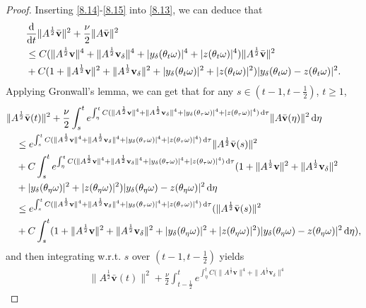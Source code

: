 \documentclass{elsarticle}
\theoremstyle{definition}
\numberwithin{equation}{section}
\renewcommand{\d}{{\rm{d}}}
\begin{document}
\begin{proof}
Inserting \eqref{8.14}-\eqref{8.15} into \eqref{8.13}, we can deduce that
\begin{align}\label{9.5}
&\frac{\d}{\d t}\|A^\frac12\bar{\textbf{v}}\|^2+  \frac{\nu}{2} \|A\bar{\textbf{v}}\|^2\nonumber\\
&\leq C(\|A^\frac12\textbf{v}\|^4+\|A^\frac12\textbf{v}_\delta\|^4+|y_\delta(\theta_t\omega)|^4+|z(\theta_t\omega)|^4)
\|A^\frac12\bar{\textbf{v}}\|^2\nonumber\\
&+ C(1+\|A^\frac12\textbf{v}\|^2+\|A^\frac12\textbf{v}_\delta\|^2+|y_\delta(\theta_t\omega)|^2+|z(\theta_t\omega)|^2)
|y_\delta(\theta_t\omega)-z(\theta_t\omega)|^2.
\end{align}
Applying Gronwall's lemma, we can get that for any $s\in(t-1, t-\frac 12)$, $t\geq 1$,
\begin{align}
 & \|A^\frac12\bar{\textbf{v}}(t)\|^2
 +  \frac{\nu }{2} \int_s^te^{\int_\eta^tC(\|A^\frac12\textbf{v}\|^4+\|A^\frac12\textbf{v}_\delta\|^4
 +|y_\delta(\theta_\tau\omega)|^4+|z(\theta_\tau\omega)|^4)\, \d \tau}\|A\bar{\textbf{v}}(\eta) \|^2 \, \d \eta
\nonumber\\
&\quad \leq e^{ \int_s^tC(\|A^\frac12\textbf{v}\|^4+\|A^\frac12\textbf{v}_\delta\|^4+|y_\delta(\theta_\tau\omega)|^4+|z(\theta_\tau\omega)|^4)\, \d \tau}\|A^\frac12\bar{\textbf{v}}(s)\|^2 \nonumber\\
&\quad +C\int_s^te^{\int_\eta^tC(\|A^\frac12\textbf{v}\|^4+\|A^\frac12\textbf{v}_\delta\|^4
 +|y_\delta(\theta_\tau\omega)|^4+|z(\theta_\tau\omega)|^4)\, \d \tau}(1+\|A^\frac12\textbf{v}\|^2+\|A^\frac12\textbf{v}_\delta\|^2\nonumber\\
 &\quad +|y_\delta(\theta_\eta\omega)|^2+|z(\theta_\eta\omega)|^2)
|y_\delta(\theta_\eta\omega)-z(\theta_\eta\omega)|^2 \, \d \eta\nonumber\\
&\quad \leq e^{ \int_s^tC(\|A^\frac12\textbf{v}\|^4+\|A^\frac12\textbf{v}_\delta\|^4+|y_\delta(\theta_\tau\omega)|^4+|z(\theta_\tau\omega)|^4)\, \d \tau}(\|A^\frac12\bar{\textbf{v}}(s)\|^2 \nonumber\\
&\quad +C\int_s^t(1+\|A^\frac12\textbf{v}\|^2+\|A^\frac12\textbf{v}_\delta\|^2 +|y_\delta(\theta_\eta\omega)|^2+|z(\theta_\eta\omega)|^2)
|y_\delta(\theta_\eta\omega)-z(\theta_\eta\omega)|^2 \, \d \eta),
\end{align}
and then integrating w.r.t. $s$ over $(t-1,t-\frac 12)$  yields
\begin{align*}
 & \|A^\frac12\bar{\textbf{v}}(t)\|^2
 + \frac{\nu}{2} \int_{t-\frac 12} ^te^{\int_\eta^tC(\|A^\frac12\textbf{v}\|^4+\|A^\frac12\textbf{v}_\delta\|^4
}
\end{align*}
\end{proof}
\end{document}
